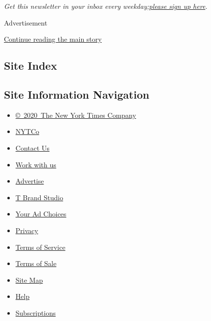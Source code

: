 \emph{Get this newsletter in your inbox every
weekday;}\href{https://www.nytimes.com/newsletters/signup/OT}{\emph{please
sign up here}}\emph{.}

Advertisement

\protect\hyperlink{after-bottom}{Continue reading the main story}

\hypertarget{site-index}{%
\subsection{Site Index}\label{site-index}}

\hypertarget{site-information-navigation}{%
\subsection{Site Information
Navigation}\label{site-information-navigation}}

\begin{itemize}
\tightlist
\item
  \href{https://help.nytimes.com/hc/en-us/articles/115014792127-Copyright-notice}{©~2020~The
  New York Times Company}
\end{itemize}

\begin{itemize}
\tightlist
\item
  \href{https://www.nytco.com/}{NYTCo}
\item
  \href{https://help.nytimes.com/hc/en-us/articles/115015385887-Contact-Us}{Contact
  Us}
\item
  \href{https://www.nytco.com/careers/}{Work with us}
\item
  \href{https://nytmediakit.com/}{Advertise}
\item
  \href{http://www.tbrandstudio.com/}{T Brand Studio}
\item
  \href{https://www.nytimes.com/privacy/cookie-policy\#how-do-i-manage-trackers}{Your
  Ad Choices}
\item
  \href{https://www.nytimes.com/privacy}{Privacy}
\item
  \href{https://help.nytimes.com/hc/en-us/articles/115014893428-Terms-of-service}{Terms
  of Service}
\item
  \href{https://help.nytimes.com/hc/en-us/articles/115014893968-Terms-of-sale}{Terms
  of Sale}
\item
  \href{https://spiderbites.nytimes.com}{Site Map}
\item
  \href{https://help.nytimes.com/hc/en-us}{Help}
\item
  \href{https://www.nytimes.com/subscription?campaignId=37WXW}{Subscriptions}
\end{itemize}
